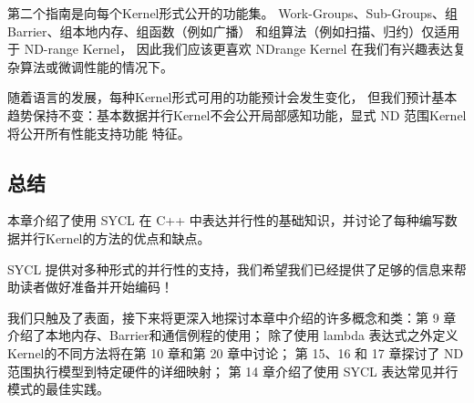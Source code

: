 第二个指南是向每个Kernel形式公开的功能集。 Work-Groups、Sub-Groups、组Barrier、组本地内存、组函数（例如广播）
和组算法（例如扫描、归约）仅适用于 ND-range Kernel，
因此我们应该更喜欢 NDrange Kernel 在我们有兴趣表达复杂算法或微调性能的情况下。

随着语言的发展，每种Kernel形式可用的功能预计会发生变化，
但我们预计基本趋势保持不变：基本数据并行Kernel不会公开局部感知功能，显式 ND 范围Kernel将公开所有性能支持功能 特征。

\subsection{总结}
本章介绍了使用 SYCL 在 C++ 中表达并行性的基础知识，并讨论了每种编写数据并行Kernel的方法的优点和缺点。

SYCL 提供对多种形式的并行性的支持，我们希望我们已经提供了足够的信息来帮助读者做好准备并开始编码！

我们只触及了表面，接下来将更深入地探讨本章中介绍的许多概念和类：第 9 章介绍了本地内存、Barrier和通信例程的使用； 
除了使用 lambda 表达式之外定义Kernel的不同方法将在第 10 章和第 20 章中讨论； 
第 15、16 和 17 章探讨了 ND 范围执行模型到特定硬件的详细映射； 
第 14 章介绍了使用 SYCL 表达常见并行模式的最佳实践。